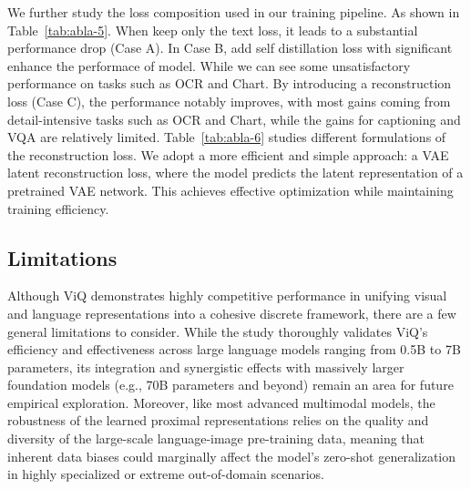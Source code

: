 We further study the loss composition used in our training pipeline. As shown in Table~\ref{tab:abla-5}. When keep only the text loss, it leads to a substantial performance drop (Case A). In Case B, add self distillation loss with significant enhance the performace of model. While we can see some unsatisfactory performance on tasks such as OCR and Chart. By introducing a reconstruction loss (Case C), the performance notably improves, with most gains coming from detail-intensive tasks such as OCR and Chart, while the gains for captioning and VQA are relatively limited. Table~\ref{tab:abla-6} studies different formulations of the reconstruction loss. We adopt a more efficient and simple approach: a VAE latent reconstruction loss, where the model predicts the latent representation of a pretrained VAE network. This achieves effective optimization while maintaining training efficiency.

\subsection{Limitations}
Although ViQ demonstrates highly competitive performance in unifying visual and language representations into a cohesive discrete framework, there are a few general limitations to consider. While the study thoroughly validates ViQ's efficiency and effectiveness across large language models ranging from 0.5B to 7B parameters, its integration and synergistic effects with massively larger foundation models (e.g., 70B parameters and beyond) remain an area for future empirical exploration. Moreover, like most advanced multimodal models, the robustness of the learned proximal representations relies on the quality and diversity of the large-scale language-image pre-training data, meaning that inherent data biases could marginally affect the model's zero-shot generalization in highly specialized or extreme out-of-domain scenarios.
